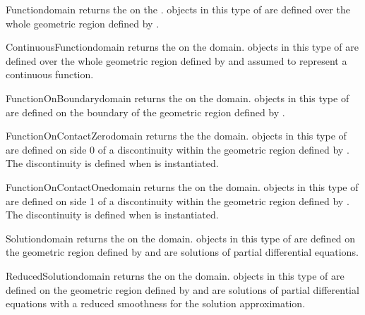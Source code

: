 \begin{funcdesc}{Function}{domain}
    returns the \Function on the \Domain {}. \Data objects in this
    type of \Function are defined over the whole geometric region defined by
    .
\end{funcdesc}
%
\begin{funcdesc}{ContinuousFunction}{domain}
    returns the \ContinuousFunction on the \Domain domain. \Data objects in
    this type of \Function are defined over the whole geometric region defined
    by  and assumed to represent a continuous function.
\end{funcdesc}
%
\begin{funcdesc}{FunctionOnBoundary}{domain}
    returns the \FunctionOnBoundary on the \Domain domain. \Data objects in
    this type of \Function are defined on the boundary of the geometric region
    defined by .
\end{funcdesc}
%
\begin{funcdesc}{FunctionOnContactZero}{domain}
    returns the \FunctionOnContactZero the \Domain domain. \Data objects in
    this type of \Function are defined on side 0 of a discontinuity  within
    the geometric region defined by .
    The discontinuity is defined when  is instantiated.
\end{funcdesc}
%
\begin{funcdesc}{FunctionOnContactOne}{domain}
    returns the \FunctionOnContactOne on the \Domain domain. \Data objects in
    this type of \Function are defined on side 1 of a discontinuity within
    the geometric region defined by .
    The discontinuity is defined when  is instantiated.
\end{funcdesc}
%
\begin{funcdesc}{Solution}{domain}
    returns the \SolutionFS on the \Domain domain. \Data objects in this type
    of \Function are defined on the geometric region defined by 
    and are solutions of partial differential equations.
\end{funcdesc}
%
\begin{funcdesc}{ReducedSolution}{domain}
    returns the \ReducedSolutionFS on the \Domain domain. \Data objects in
    this type of \Function are defined on the geometric region defined by
     and are solutions of partial differential
    equations with a reduced smoothness
    for the solution approximation.
\end{funcdesc}

